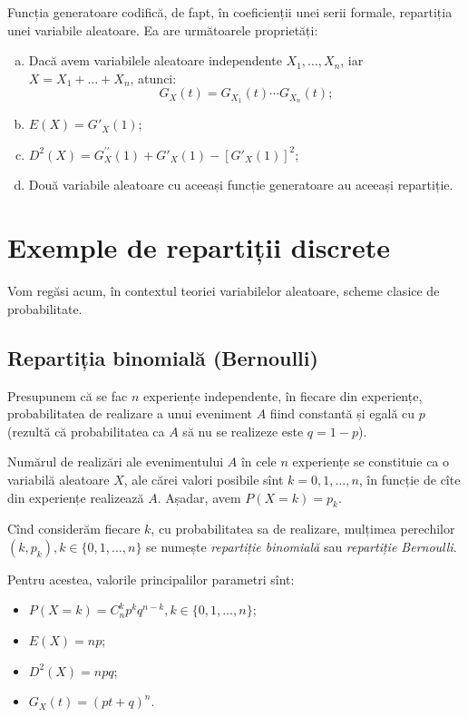 \documentclass[12pt,a4paper]{article}
\theoremstyle{dotless}
\theoremstyle{dotlessdr}
\begin{document}
Funcția generatoare codifică, de fapt, în coeficienții unei serii formale,
repartiția unei variabile aleatoare. Ea are următoarele proprietăți:
\begin{enumerate}[(a)]
\item Dacă avem variabilele aleatoare independente $ X_1, \dots, X_n $,
  iar $ X = X_1 + \dots + X_n $, atunci:
  \[
    G_X(t) = G_{X_1}(t) \cdots G_{X_n}(t);
  \]
\item $ E(X) = G'_X(1) $;
\item $ D^2(X) = G_X^{\prime\prime}(1) + G'_X(1) - [G'_X(1)]^2 $;
\item Două variabile aleatoare cu aceeași funcție generatoare au aceeași repartiție.
\end{enumerate}


\section*{Exemple de repartiții discrete}

\indent\indent Vom regăsi acum, în contextul teoriei variabilelor aleatoare,
scheme clasice de probabilitate.



\subsection*{Repartiția binomială (Bernoulli)}
\indent\indent Presupunem că se fac $ n $ experiențe independente, în fiecare din
experiențe, probabilitatea de realizare a unui eveniment $ A $ fiind constantă
și egală cu $ p $ (rezultă că probabilitatea ca $ A $ să nu se realizeze este
$ q = 1 - p $).

Numărul de realizări ale evenimentului $ A $ în cele $ n $ experiențe se constituie
ca o variabilă aleatoare $ X $, ale cărei valori posibile sînt $ k = 0, 1, \dots, n $,
în funcție de cîte din experiențe realizează $ A $. Așadar, avem $ P(X = k) = p_k $.

Cînd considerăm fiecare $ k $, cu probabilitatea sa de realizare, mulțimea perechilor
$ (k, p_k), k \in \{0, 1, \dots, n \} $ se numește \emph{repartiție binomială} sau
\emph{repartiție Bernoulli}.

Pentru acestea, valorile principalilor parametri sînt:
\begin{itemize}
\item $ P(X = k) = C_n^k p^k q^{n-k}, k \in \{0, 1, \dots, n\} $;
\item $ E(X) = np $;
\item $ D^2(X) = npq $;
\item $ G_X(t) = (pt + q)^n $.
\end{itemize}
\end{document}
